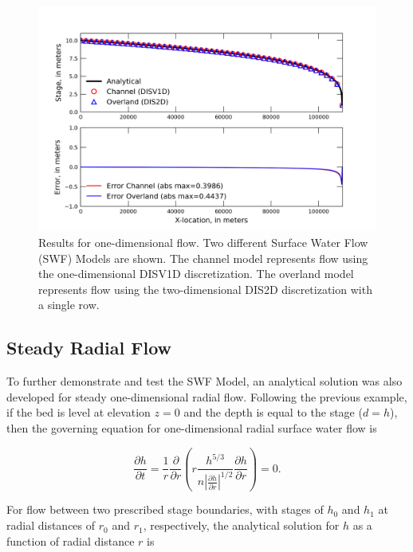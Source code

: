 \documentclass[fleqn]{article}
\begin{document}
\begin{figure}[h!tbp]
	\centering
	\includegraphics[scale=1.0]{figures/oned.png}
	\caption[Results for one-dimensional flow.]{Results for one-dimensional flow.  Two different Surface Water Flow (SWF) Models are shown.  The channel model represents flow using the one-dimensional DISV1D discretization.  The overland model represents flow using the two-dimensional DIS2D discretization with a single row.}
	\label{fig:oned-results}
\end{figure}

\newpage
\subsection{Steady Radial Flow}

To further demonstrate and test the SWF Model, an analytical solution was also developed for steady one-dimensional radial flow.  Following the previous example, if the bed is level at elevation $z = 0$ and the depth is equal to the stage ($d = h$), then the governing equation for one-dimensional radial surface water flow is

\begin{equation}
  \frac{\partial h}{\partial t} = \frac{1}{r} \frac{\partial}{\partial r} 
  \left (r \frac{h^{5/3}}{n \left | \frac{\partial h}{\partial r} \right |^{1/2}} 
  \frac{\partial h}{\partial r} \right ) = 0 .
\end{equation}

\noindent For flow between two prescribed stage boundaries, with stages of $h_0$ and $h_1$ at radial distances of $r_0$ and $r_1$, respectively, the analytical solution for $h$ as a function of radial distance $r$ is
\end{document}
